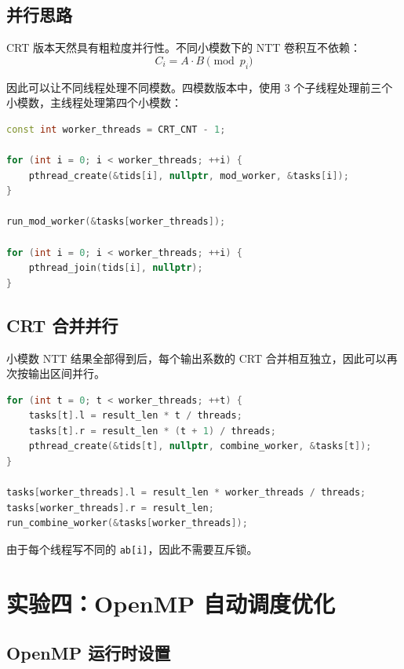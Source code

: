 \documentclass[a4paper]{article}
\begin{document}
\subsection{并行思路}

CRT 版本天然具有粗粒度并行性。不同小模数下的 NTT 卷积互不依赖：
\[
C_i=A\cdot B\pmod {p_i}
\]

因此可以让不同线程处理不同模数。四模数版本中，使用 3 个子线程处理前三个小模数，主线程处理第四个小模数：

\begin{lstlisting}[title=四模数任务并行,frame=trbl,language={C++}]
const int worker_threads = CRT_CNT - 1;

for (int i = 0; i < worker_threads; ++i) {
    pthread_create(&tids[i], nullptr, mod_worker, &tasks[i]);
}

run_mod_worker(&tasks[worker_threads]);

for (int i = 0; i < worker_threads; ++i) {
    pthread_join(tids[i], nullptr);
}
\end{lstlisting}

\subsection{CRT 合并并行}

小模数 NTT 结果全部得到后，每个输出系数的 CRT 合并相互独立，因此可以再次按输出区间并行。

\begin{lstlisting}[title=CRT 合并任务划分,frame=trbl,language={C++}]
for (int t = 0; t < worker_threads; ++t) {
    tasks[t].l = result_len * t / threads;
    tasks[t].r = result_len * (t + 1) / threads;
    pthread_create(&tids[t], nullptr, combine_worker, &tasks[t]);
}

tasks[worker_threads].l = result_len * worker_threads / threads;
tasks[worker_threads].r = result_len;
run_combine_worker(&tasks[worker_threads]);
\end{lstlisting}

由于每个线程写不同的 \texttt{ab[i]}，因此不需要互斥锁。

\section{实验四：OpenMP 自动调度优化}

\subsection{OpenMP 运行时设置}
\end{document}
